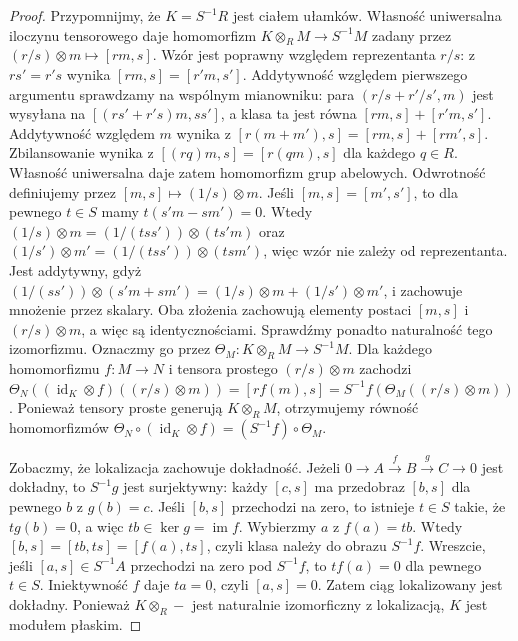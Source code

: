 \begin{proof}
Przypomnijmy, że $K=S^{-1}R$ jest ciałem ułamków.
Własność uniwersalna iloczynu tensorowego daje
homomorfizm $K\otimes_RM\to S^{-1}M$ zadany przez
$(r/s)\otimes m\mapsto[rm,s]$. Wzór jest poprawny
względem reprezentanta $r/s$: z $rs'=r's$
wynika $[rm,s]=[r'm,s']$. Addytywność względem
pierwszego argumentu sprawdzamy na wspólnym mianowniku:
para $(r/s+r'/s',m)$ jest wysyłana na
$[(rs'+r's)m,ss']$, a klasa ta jest równa
$[rm,s]+[r'm,s']$.
Addytywność względem $m$ wynika z
$[r(m+m'),s]=[rm,s]+[rm',s]$.
Zbilansowanie wynika z $[(rq)m,s]=[r(qm),s]$
dla każdego $q\in R$. Własność uniwersalna daje
zatem homomorfizm grup abelowych.
Odwrotność definiujemy przez
$[m,s]\mapsto(1/s)\otimes m$.
Jeśli $[m,s]=[m',s']$, to dla pewnego $t\in S$
mamy $t(s'm-sm')=0$. Wtedy
$(1/s)\otimes m=(1/(tss'))\otimes(t s'm)$ oraz
$(1/s')\otimes m'=(1/(tss'))\otimes(t sm')$,
więc wzór nie zależy od reprezentanta.
Jest addytywny, gdyż
$(1/(ss'))\otimes(s'm+sm')=
(1/s)\otimes m+(1/s')\otimes m'$, i zachowuje
mnożenie przez skalary. Oba złożenia zachowują
elementy postaci $[m,s]$ i $(r/s)\otimes m$,
a więc są identycznościami.
Sprawdźmy ponadto naturalność tego izomorfizmu.
Oznaczmy go przez $\Theta_M:K\otimes_RM\to S^{-1}M$.
Dla każdego homomorfizmu $f:M\to N$ i tensora prostego
$(r/s)\otimes m$ zachodzi
$\Theta_N((\operatorname{id}_K\otimes f)((r/s)\otimes m))
=[rf(m),s]=S^{-1}f(\Theta_M((r/s)\otimes m))$.
Ponieważ tensory proste generują $K\otimes_RM$,
otrzymujemy równość homomorfizmów
$\Theta_N\circ(\operatorname{id}_K\otimes f)
=(S^{-1}f)\circ\Theta_M$.

Zobaczmy, że lokalizacja zachowuje dokładność.
Jeżeli $0\to A\xrightarrow{f}B\xrightarrow{g}C\to0$
jest dokładny, to $S^{-1}g$ jest surjektywny:
każdy $[c,s]$ ma przedobraz $[b,s]$ dla pewnego
$b$ z $g(b)=c$. Jeśli $[b,s]$ przechodzi na zero,
to istnieje $t\in S$ takie, że $t g(b)=0$,
a więc $tb\in\ker g=\operatorname{im}f$.
Wybierzmy $a$ z $f(a)=tb$. Wtedy
$[b,s]=[tb,ts]=[f(a),ts]$, czyli klasa należy
do obrazu $S^{-1}f$. Wreszcie, jeśli
$[a,s]\in S^{-1}A$ przechodzi na zero pod
$S^{-1}f$, to $tf(a)=0$ dla pewnego $t\in S$.
Iniektywność $f$ daje $ta=0$, czyli $[a,s]=0$.
Zatem ciąg lokalizowany jest dokładny.
Ponieważ $K\otimes_R-$ jest naturalnie izomorficzny
z lokalizacją, $K$ jest modułem płaskim.
\end{proof}

